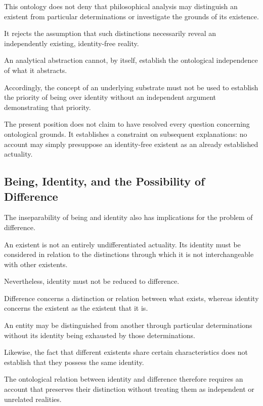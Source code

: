 This ontology does not deny that
philosophical analysis may distinguish
an existent from particular determinations
or investigate the grounds of its existence.

It rejects the assumption that such
distinctions necessarily reveal an
independently existing, identity-free
reality.

An analytical abstraction cannot,
by itself, establish the ontological
independence of what it abstracts.

Accordingly, the concept of an underlying
substrate must not be used to establish
the priority of being over identity
without an independent argument
demonstrating that priority.

The present position does not claim
to have resolved every question concerning
ontological grounds. It establishes
a constraint on subsequent explanations:
no account may simply presuppose an
identity-free existent as an already
established actuality.



\subsection{Being, Identity, and the Possibility of Difference}

The inseparability of being and identity
also has implications for the problem
of difference.

An existent is not an entirely
undifferentiated actuality. Its identity
must be considered in relation to the
distinctions through which it is not
interchangeable with other existents.

Nevertheless, identity must not be
reduced to difference.

Difference concerns a distinction or
relation between what exists, whereas
identity concerns the existent as
the existent that it is.

An entity may be distinguished from
another through particular determinations
without its identity being exhausted
by those determinations.

Likewise, the fact that different
existents share certain characteristics
does not establish that they possess
the same identity.

The ontological relation between identity
and difference therefore requires an
account that preserves their distinction
without treating them as independent
or unrelated realities.

